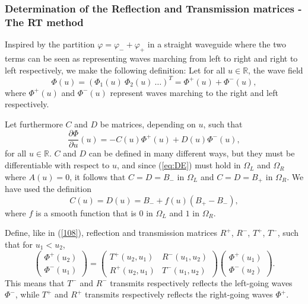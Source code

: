\documentclass[numreferences]{kluwer}
\renewcommand{\phi}{\varphi}
\renewcommand{\Phi}{\varPhi}
\renewcommand{\vec}[1]{\bm{#1}}
\newcommand{\R}{\mathbb R}
\renewcommand{\Phi}{\varPhi}
\begin{document}
\subsubsection{Determination of the Reflection and Transmission
  matrices - The RT method}
\label{sec:RT}

Inspired by the partition $\phi=\phi_-+\phi_+$ in a straight waveguide
where the two terms can be seen as representing waves marching from
left to right and right to left respectively, we make the following
definition: Let for all $u\in\R$, the wave field
\begin{equation}
  \label{eq:Phipart1}
  \vec\Phi(u)=(\Phi_1(u)\ \Phi_2(u)\ \dots)^T
  =\vec\Phi^+(u)+\vec\Phi^-(u),
\end{equation}
where $\vec\Phi^+(u)$ and $\vec\Phi^-(u)$ represent waves marching to
the right and left respectively.

Let furthermore $C$ and $D$ be matrices, depending on $u$, such that
\begin{equation}
  \label{eq:plusminustodiff}
  \dfrac{\partial\vec\Phi}{\partial u}(u)=
  -C(u)\vec\Phi^+(u)+D(u)\vec\Phi^-(u),
\end{equation}
for all $u\in\R$. $C$ and $D$ can be defined in many different ways,
but they must be differentiable with respect to $u$, and since
(\ref{eq:DE}) must hold in $\Omega_L$ and $\Omega_R$ where $A(u)=0$,
it follows that $C=D=B_-$ in $\Omega_L$ and $C=D=B_+$ in
$\Omega_R$. We have used the definition
\begin{equation}
  \label{eq:CD}
  C(u)=D(u)=B_-+f(u)(B_+-B_-),
\end{equation}
where $f$ is a smooth function that is $0$ in $\Omega_L$ and $1$ in
$\Omega_R$.

Define, like in (\ref{108}), reflection and transmission matrices
$R^+$, $R^-$, $T^+$, $T^-$, such that for $u_1<u_2$,
\begin{equation}
  \label{eq:RT}
  \begin{pmatrix}
    \vec\Phi^+(u_2)\\
    \vec\Phi^-(u_1)
  \end{pmatrix}=
  \begin{pmatrix}
    T^+(u_2,u_1)&R^-(u_1,u_2)\\
    R^+(u_2,u_1)&T^-(u_1,u_2)
  \end{pmatrix}
  \begin{pmatrix}
    \vec\Phi^+(u_1)\\
    \vec\Phi^-(u_2)
  \end{pmatrix}.
\end{equation}
This means that $T^-$ and $R^-$ transmits respectively reflects the
left-going waves $\vec\Phi^-$, while $T^+$ and $R^+$ transmits
respectively reflects the right-going waves $\vec\Phi^+$.
\end{document}
